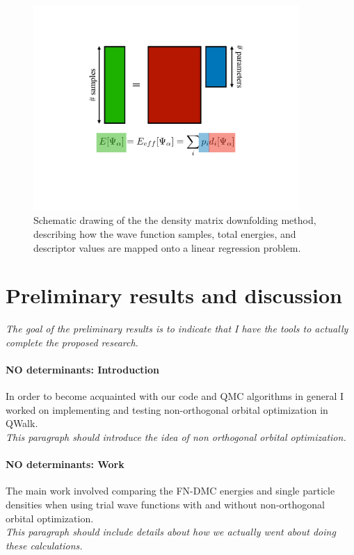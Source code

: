 \documentclass{article}
\begin{document}
\begin{figure}[H]
\centering
\includegraphics[width=0.9\textwidth]{Figures/I2-DMD_diagram.pdf}
\caption{\label{fig2} Schematic drawing of the the density matrix downfolding method, describing how the wave function samples, total energies, and descriptor values are mapped onto a linear regression problem.}
\end{figure}


\pagebreak

\section{Preliminary results and discussion}
\textit{The goal of the preliminary results is to indicate that I have the tools to actually complete the proposed research.}

\paragraph{NO determinants: Introduction} In order to become acquainted with our code  and QMC algorithms in general I worked on implementing and testing non-orthogonal orbital optimization in QWalk. 
\\
\textit{This paragraph should introduce the idea of non orthogonal orbital optimization.}

\paragraph{NO determinants: Work} The main work involved comparing the FN-DMC energies and single particle densities when using trial wave functions with and without non-orthogonal orbital optimization.
\\
\textit{This paragraph should include details about how we actually went about doing these calculations.}
\end{document}
